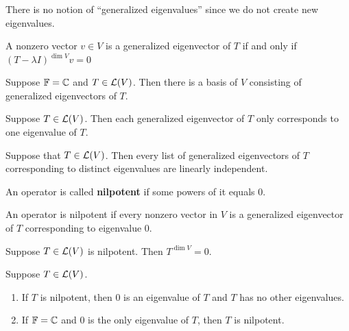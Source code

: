 \documentclass{extarticle}
\begin{document}
\begin{remark}
    There is no notion of ``generalized eigenvalues'' since 
    we do not create new eigenvalues. 
\end{remark}

\begin{remark}
    A nonzero vector \(v \in V\) is a generalized eigenvector 
    of \(T\) if and only if \((T - \lambda I)^{\dim V} v = 0\)
\end{remark}

\begin{thm}
    Suppose \(\mathbb{F} = \mathbb{C}\) and \(T \in \mathcal{L}(V)\). Then 
    there is a basis of \(V\) consisting of generalized 
    eigenvectors of \(T\).    
\end{thm}

\begin{proposition}
    Suppose \(T \in \mathcal{L}(V)\). Then each generalized 
    eigenvector of \(T\) only corresponds to one eigenvalue 
    of \(T\).
\end{proposition}

\begin{proposition}
    Suppose that \(T \in \mathcal{L}(V)\). Then every list of 
    generalized eigenvectors of \(T\) corresponding to 
    distinct eigenvalues are linearly independent.
\end{proposition}

\begin{definition}[nilpotent]
    An operator is called \textbf{nilpotent} if some powers
    of it equals 0.    
\end{definition}

\begin{remark}
    An operator is nilpotent if every nonzero vector in 
    \(V\) is a generalized eigenvector of \(T\) corresponding 
    to eigenvalue 0. 
\end{remark}

\begin{corollary}
    Suppose \(T \in \mathcal{L}(V)\) is nilpotent. Then \(T^{\dim V} = 0\).
\end{corollary}

\begin{thm}
    Suppose \(T \in \mathcal{L}(V)\). 
    \begin{enumerate}[label=(\alph*)]
        \item If \(T\) is nilpotent, then \(0\) is an eigenvalue of \(T\) and \(T\) has no other 
        eigenvalues. 
        \item If \(\mathbb{F} = \mathbb{C}\) and \(0\) is the only eigenvalue of \(T\), then \(T\) is nilpotent.
    \end{enumerate}
\end{thm}
\end{document}
